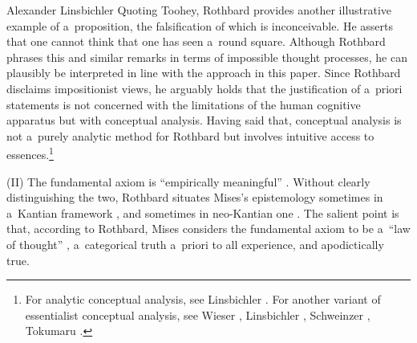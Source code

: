 \begin{artengenv}{Alexander Linsbichler}
Quoting Toohey, Rothbard 
\parencite*[][p.28]{rothbard_praxeology:_1976} %
 provides another illustrative example of a~proposition, the falsification of which is inconceivable. He asserts that one cannot think that one has seen a~round square. Although Rothbard phrases this and similar remarks in terms of impossible thought processes, he can plausibly be interpreted in line with the approach in this paper. Since Rothbard disclaims impositionist views, he arguably holds that the justification of a~priori statements is not concerned with the limitations of the human cognitive apparatus but with conceptual analysis. Having said that, conceptual analysis is not a~purely analytic method for Rothbard but involves intuitive access to essences.\footnote{For analytic conceptual analysis, see Linsbichler 
\parencite*[][pp.81–83]{linsbichler_was_2017}. %
 For another variant of essentialist conceptual analysis, see Wieser 
\parencite*[][]{wieser_uber_1884}, %
 Linsbichler 
\parencites*[][]{linsbichler_sprachgeist_2021}[][]{linsbichler_case_2023}, %
 Schweinzer 
\parencite*[][]{schweinzer_two_2000}, %
 Tokumaru 
\parencite*[][]{tokumaru_wiesers_2015}.%
}

\medskip

\noindent (II) The fundamental axiom is ``empirically meaningful'' 
\parencite[][p.318]{rothbard_defense_1957}. %
 Without clearly distinguishing the two, Rothbard situates Mises's epistemology sometimes in a~Kantian framework 
\parencite[][p.33]{rothbard_praxeology_2011}, %
 and sometimes in neo-Kantian one 
\parencite[][pp.317–318]{rothbard_defense_1957}. %
 The salient point is that, according to Rothbard, Mises considers the fundamental axiom to be a~``law of thought'' 
\parencite[][p.318]{rothbard_defense_1957}, %
 a~categorical truth a~priori to all experience, and apodictically true.




\end{artengenv}
